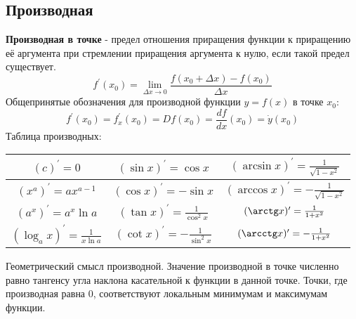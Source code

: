 \subsection{Производная}
\textbf{Производная в точке} - предел отношения приращения функции к приращению её аргумента при стремлении приращения аргумента к нулю, если такой предел существует.
\begin{equation}
f^\prime(x_0) = \lim_{\Delta x \to 0}\frac{f(x_0 + \Delta x) - f(x_0)}{\Delta x}
\end{equation}
Общепринятые обозначения для производной функции $y = f(x)$ в точке $x_0$:
\begin{equation}
f^\prime(x_0) = f^\prime_x(x_0) = D f(x_0) = \frac{d f}{d x}(x_0) = \dot{y} (x_0)
\end{equation}
Таблица производных:
\begin{center}
\begin{tabular}{|c|c|c|}
\hline
$(c)^\prime = 0$ & $(\sin x)^\prime = \cos x$ & $(\arcsin x)^\prime = \frac{1}{\sqrt{1 - x^2}}$ \\
\hline
$(x^a)^\prime = a x^{a-1}$ & $(\cos x)^\prime = - \sin x$ & $(\arccos x)^\prime = - \frac{1}{\sqrt{1 - x^2}}$ \\
\hline
$(a^x)^\prime = a^x \ln a$ & $(\tan x)^\prime = \frac{1}{\cos^2 x}$ & $(\arctg x)^\prime = \frac{1}{1 + x^2}$ \\
\hline
$(\log_a x)^\prime = \frac{1}{x \ln a}$ & $(\cot x)^\prime = - \frac{1}{\sin^2 x}$ & $(\arcctg x)^\prime = - \frac{1}{1 + x^2}$ \\
\hline
\end{tabular}
\end{center}
Геометрический смысл производной. Значение производной в точке численно равно тангенсу угла наклона касательной к функции в данной точке. Точки, где производная равна 0, соответствуют локальным минимумам и максимумам функции.
